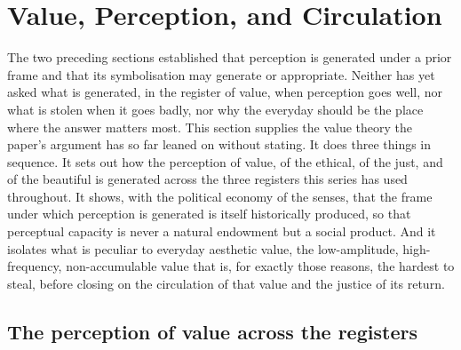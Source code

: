 \section{Value, Perception, and Circulation}
\label{p23:sec:value}

\noindent
The two preceding sections established that perception is generated under a prior frame and that its symbolisation may generate or appropriate. Neither has yet asked what is generated, in the register of value, when perception goes well, nor what is stolen when it goes badly, nor why the everyday should be the place where the answer matters most. This section supplies the value theory the paper's argument has so far leaned on without stating. It does three things in sequence. It sets out how the perception of value, of the ethical, of the just, and of the beautiful is generated across the three registers this series has used throughout. It shows, with the political economy of the senses, that the frame under which perception is generated is itself historically produced, so that perceptual capacity is never a natural endowment but a social product. And it isolates what is peculiar to everyday aesthetic value, the low-amplitude, high-frequency, non-accumulable value that is, for exactly those reasons, the hardest to steal, before closing on the circulation of that value and the justice of its return.

\subsection{The perception of value across the registers}
\label{p23:sub:val-registers}

